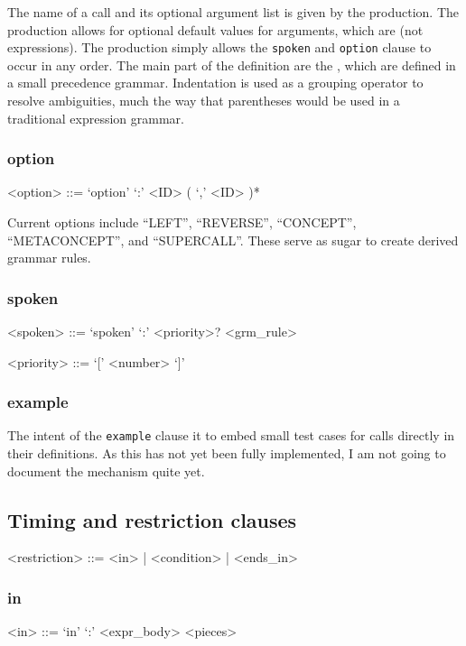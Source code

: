 \documentclass[12pt]{article}
\newcommand{\clause}[1]{\texttt{#1}}
\begin{document}
The name of a call and its optional argument list is given by the
 production.  The 
production allows for optional default values for arguments, which are
 (not expressions).  The 
production simply allows the \clause{spoken} and \clause{option}
clause to occur in any order.  The main part of the definition are the
, which are defined in a small precedence grammar.
Indentation is used as a grouping operator to resolve ambiguities,
much the way that parentheses would be used in a traditional
expression grammar.

\subsubsection{option}
\begin{grammar}
<option> ::= `option' `:' <ID> ( `,' <ID> )*
\end{grammar}

Current options include ``LEFT'', ``REVERSE'', ``CONCEPT'', ``METACONCEPT'',
and ``SUPERCALL''.  These serve as sugar to create derived grammar rules.

\subsubsection{spoken}
\begin{grammar}
<spoken> ::= `spoken' `:' <priority>? <grm_rule>

<priority> ::= `[' <number> `]'
\end{grammar}

\subsubsection{example}
The intent of the \clause{example} clause it to embed small test cases
for calls directly in their definitions.  As this has not yet been
fully implemented, I am not going to document the mechanism
quite yet.

\subsection{Timing and restriction clauses}
\begin{grammar}
<restriction> ::= <in> | <condition> | <ends_in>
\end{grammar}

\subsubsection{in}\label{sec:in}
\begin{grammar}
<in> ::= `in' `:' <expr_body> <pieces>
\end{grammar}
\end{document}
